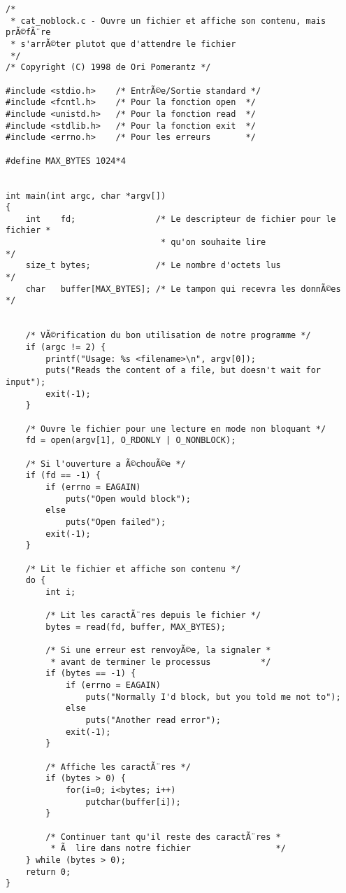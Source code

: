 \documentclass[11pt]{article}
\begin{document}
\begin{verbatim}
/*
 * cat_noblock.c - Ouvre un fichier et affiche son contenu, mais prÃ©fÃ¨re
 * s'arrÃ©ter plutot que d'attendre le fichier
 */
/* Copyright (C) 1998 de Ori Pomerantz */

#include <stdio.h>    /* EntrÃ©e/Sortie standard */
#include <fcntl.h>    /* Pour la fonction open  */
#include <unistd.h>   /* Pour la fonction read  */
#include <stdlib.h>   /* Pour la fonction exit  */
#include <errno.h>    /* Pour les erreurs       */

#define MAX_BYTES 1024*4


int main(int argc, char *argv[])
{
    int    fd;                /* Le descripteur de fichier pour le fichier *
                               * qu'on souhaite lire                       */
    size_t bytes;             /* Le nombre d'octets lus                    */
    char   buffer[MAX_BYTES]; /* Le tampon qui recevra les donnÃ©es         */


    /* VÃ©rification du bon utilisation de notre programme */
    if (argc != 2) {
        printf("Usage: %s <filename>\n", argv[0]);
        puts("Reads the content of a file, but doesn't wait for input");
        exit(-1);
    }

    /* Ouvre le fichier pour une lecture en mode non bloquant */
    fd = open(argv[1], O_RDONLY | O_NONBLOCK);

    /* Si l'ouverture a Ã©chouÃ©e */
    if (fd == -1) {
        if (errno = EAGAIN)
            puts("Open would block");
        else
            puts("Open failed");
        exit(-1);
    }

    /* Lit le fichier et affiche son contenu */
    do {
        int i;

        /* Lit les caractÃ¨res depuis le fichier */
        bytes = read(fd, buffer, MAX_BYTES);

        /* Si une erreur est renvoyÃ©e, la signaler *
         * avant de terminer le processus          */
        if (bytes == -1) {
            if (errno = EAGAIN)
                puts("Normally I'd block, but you told me not to");
            else
                puts("Another read error");
            exit(-1);
        }

        /* Affiche les caractÃ¨res */
        if (bytes > 0) {
            for(i=0; i<bytes; i++)
                putchar(buffer[i]);
        }

        /* Continuer tant qu'il reste des caractÃ¨res *
         * Ã  lire dans notre fichier                 */
    } while (bytes > 0);
    return 0;
}
\end{verbatim}
\end{document}
